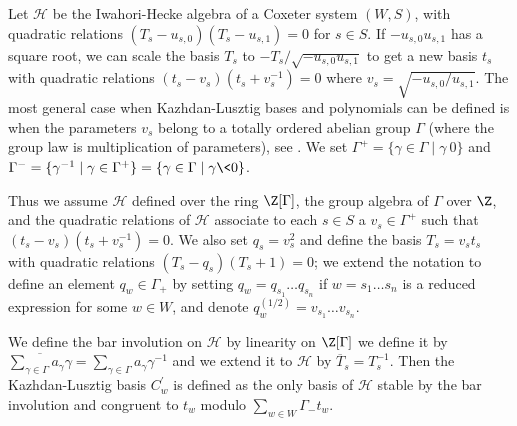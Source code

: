 \newcommand\cH{{\mathcal H}}
\newcommand\cC{{\mathcal C}}
\newcommand\ca{{\mathcal a}}
\newcommand\cA{{\mathcal A}}

Let  $\cH$ be the  Iwahori-Hecke algebra of  a Coxeter system $(W,S)$, with
quadratic   relations  $(T_s-u_{s,0})(T_s-u_{s,1})=0$  for   $s\in  S$.  If
$-u_{s,0}u_{s,1}$  has  a  square  root,  we  can  scale the basis $T_s$ to
$-T_s/\sqrt{-u_{s,0}u_{s,1}}$  to  get  a  new  basis  $t_s$ with quadratic
relations $(t_s-v_s) (t_s+v_s^{-1})=0$ where $v_s=\sqrt{-u_{s,0}/u_{s,1}}$.
The  most general  case when  Kazhdan-Lusztig bases  and polynomials can be
defined  is when the  parameters $v_s$ belong  to a totally ordered abelian
group  $\Gamma$ (where the group law  is multiplication of parameters), see
\cite{Lus83}.  We  set  $\Gamma^+=  \{\gamma\in\Gamma\mid  \gamma\>0\}$ and
$\Gamma^-=   \{\gamma^{-1}  \mid\gamma\in\Gamma^+\}  =\{\gamma\in\Gamma\mid
\gamma\<0\}$.

Thus  we assume $\cH$ defined over the ring $\Z[\Gamma]$, the group algebra
of  $\Gamma$ over $\Z$,  and the quadratic  relations of $\cH$ associate to
each  $s\in S$ a $v_s\in\Gamma^+$ such that $(t_s-v_s)(t_s+v_s^{-1})=0$. We
also  set  $q_s=v_s^2$  and  define the basis  $T_s=v_s t_s$ with quadratic
relations $(T_s-q_s)(T_s+1)=0$; we extend the notation to define an element
$q_w\in\Gamma_+$  by  setting  $q_w=q_{s_1}\ldots  q_{s_n}$ if $w=s_1\ldots
s_n$ is a reduced expression for some $w\in W$, and denote
$q_w^{(1/2)}=v_{s_1}\ldots    v_{s_n}$.

We  define the  bar involution  on $\cH$  by linearity\: on $\Z[\Gamma]$ we
define      it     by     $\overline{\sum_{\gamma\in\Gamma}a_\gamma\gamma}=
\sum_{\gamma\in\Gamma}  a_\gamma \gamma^{-1}$ and we  extend it to $\cH$ by
$\overline  T_s=T_s^{-1}$. Then  the Kazhdan-Lusztig  basis $C^\prime_w$ is
defined  as  the  only  basis  of  $\cH$  stable  by the bar involution and
congruent to $t_w$ modulo $\sum_{w\in W}\Gamma_- t_w$.

